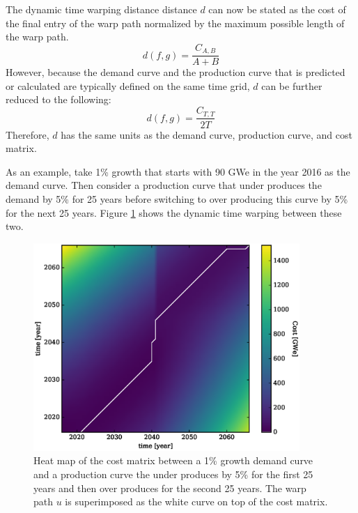 The dynamic time warping distance distance $d$ can now be stated as the 
cost of the final entry of the warp path normalized by the maximum possible
length of the warp path.  
\begin{equation}
\label{d-calc-ab}
d(f, g) = \frac{C_{A,B}}{A + B}
\end{equation}
However, because the demand curve and the production curve that is predicted
or calculated are typically defined on the same time grid, $d$ can be further
reduced to the following:
\begin{equation}
\label{d-calc}
d(f, g) = \frac{C_{T,T}}{2T}
\end{equation}
Therefore, $d$ has the same units as the demand curve, production curve, 
and cost matrix.

As an example, take 1\% growth that starts with 90 GWe in the year 
2016 as the demand curve. Then consider a production curve that 
under produces the demand by 5\% for 25 years before switching to over 
producing this curve by 5\% for the next 25 years.  
Figure \ref{cost-demand-to-production} shows the dynamic time warping 
between these two.

\begin{figure}[htb]
\centering
\includegraphics[width=0.9\textwidth]{cost-demand-to-production.eps}
\caption{Heat map of the cost matrix between a 1\% growth demand curve and 
a production curve the under produces by 5\% for the first 25 years and then
over produces for the second 25 years.  
The warp path $u$ is superimposed as the white curve on top of the 
cost matrix.}
\label{cost-demand-to-production}
\end{figure}

